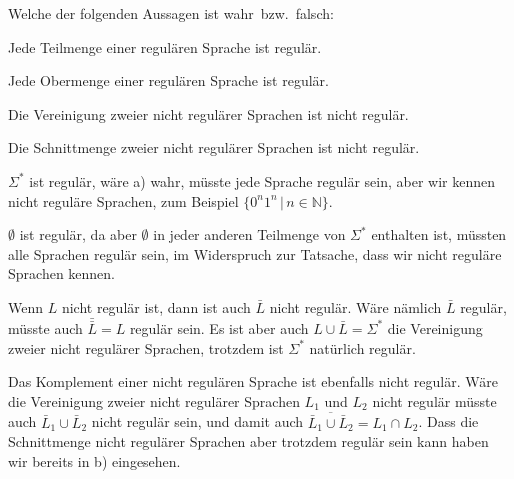 Welche der folgenden Aussagen ist wahr~bzw.~falsch:
\begin{teilaufgaben}
\item Jede Teilmenge einer regulären Sprache ist regulär.
\item Jede Obermenge einer regulären Sprache ist regulär.
\item Die Vereinigung zweier nicht regulärer Sprachen ist nicht regulär.
\item Die Schnittmenge zweier nicht regulärer Sprachen ist nicht
regulär.
\end{teilaufgaben}

\begin{loesung}
\begin{teilaufgaben}
\item $\Sigma^*$ ist regulär, wäre a) wahr, müsste jede Sprache regulär
sein, aber wir kennen nicht reguläre Sprachen, zum Beispiel
$\{0^n1^n\,|\,n\in\mathbb N\}$.
\item $\emptyset$ ist regulär, da aber $\emptyset$ in jeder anderen
Teilmenge von $\Sigma^*$ enthalten ist, müssten alle Sprachen regulär
sein, im Widerspruch zur Tatsache, dass wir nicht reguläre Sprachen
kennen.
\item Wenn $L$ nicht regulär ist, dann ist auch $\bar L$ nicht regulär.
Wäre nämlich $\bar L$ regulär, müsste auch $\bar{\bar L}=L$ regulär
sein. Es ist aber auch $L\cup \bar L=\Sigma^*$ die Vereinigung zweier
nicht regulärer Sprachen, trotzdem ist $\Sigma^*$ natürlich regulär.
\item Das Komplement einer nicht regulären Sprache ist ebenfalls nicht
regulär. Wäre die Vereinigung zweier nicht regulärer Sprachen $L_1$
und $L_2$ nicht regulär müsste auch $\bar L_1\cup \bar L_2$ nicht
regulär sein, und damit auch $\overline{\bar L_1\cup \bar L_2}=L_1\cap L_2$.
Dass die Schnittmenge nicht regulärer Sprachen aber trotzdem regulär
sein kann haben wir bereits in b) eingesehen.
\qedhere
\end{teilaufgaben}
\end{loesung}

